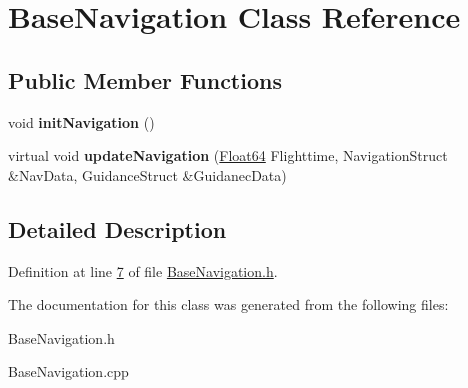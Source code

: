 \hypertarget{class_base_navigation}{}\section{Base\+Navigation Class Reference}
\label{class_base_navigation}
\subsection*{Public Member Functions}
\begin{DoxyCompactItemize}
\item 
\mbox{\label{class_base_navigation_adf2cb6290f418405c3ed508c5e6fe71a}} 
void {\bfseries init\+Navigation} ()
\item 
\mbox{\label{class_base_navigation_acd2915aac7b21cde1ffb081218149aef}} 
virtual void {\bfseries update\+Navigation} (\hyperlink{group___tools_ga3f1431cb9f76da10f59246d1d743dc2c}{Float64} Flighttime, Navigation\+Struct \&Nav\+Data, Guidance\+Struct \&Guidanec\+Data)
\end{DoxyCompactItemize}


\subsection{Detailed Description}


Definition at line \hyperlink{_base_navigation_8h_source_l00007}{7} of file \hyperlink{_base_navigation_8h_source}{Base\+Navigation.\+h}.



The documentation for this class was generated from the following files\+:\begin{DoxyCompactItemize}
\item 
Base\+Navigation.\+h\item 
Base\+Navigation.\+cpp\end{DoxyCompactItemize}
